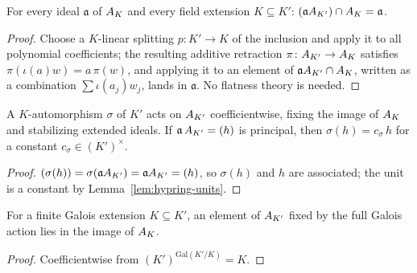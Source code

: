 \begin{lemma}[Contraction]
\label{lem:basechange-contract}
\leanok
{}
For every ideal $\mathfrak a$ of $A_{K}$ and every field extension $K \subseteq K'$:
$(\mathfrak a A_{K'}) \cap A_{K} = \mathfrak a$.
\end{lemma}
\begin{proof}
\leanok
Choose a $K$-linear splitting $p \colon K' \to K$ of the inclusion and apply it to all
polynomial coefficients; the resulting additive retraction
$\pi \colon A_{K'} \to A_{K}$ satisfies $\pi(\iota(a)w) = a\,\pi(w)$, and applying
it to an element of $\mathfrak a A_{K'} \cap A_{K}$, written as a combination
$\sum \iota(a_j) w_j$, lands in $\mathfrak a$. No flatness theory is needed.
\end{proof}

\begin{lemma}
\label{lem:basechange-galact}
\leanok
{}
A $K$-automorphism $\sigma$ of $K'$ acts on $A_{K'}$ coefficientwise, fixing the
image of $A_{K}$ and stabilizing extended ideals. If
$\mathfrak a\,A_{K'} = (h)$ is principal, then $\sigma(h) = c_\sigma\, h$ for a
constant $c_\sigma \in (K')^\times$.
\end{lemma}
\begin{proof}
\leanok
$(\sigma(h)) = \sigma(\mathfrak a A_{K'}) = \mathfrak a A_{K'} = (h)$, so
$\sigma(h)$ and $h$ are associated; the unit is a constant by
Lemma~\ref{lem:hypring-units}.
\end{proof}

\begin{lemma}
\label{lem:basechange-fixed}
\leanok
{}
For a finite Galois extension $K \subseteq K'$, an element of $A_{K'}$ fixed by the
full Galois action lies in the image of $A_{K}$.
\end{lemma}
\begin{proof}
\leanok
Coefficientwise from $(K')^{\mathrm{Gal}(K'/K)} = K$.
\end{proof}

